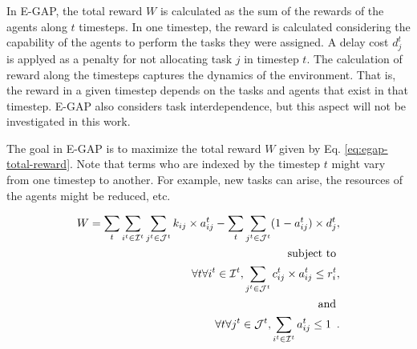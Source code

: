 \documentclass[a4paper]{sbgames}
\begin{document}
% 
In E-GAP, the total reward $W$ is calculated as the sum of the rewards of the agents along $t$ timesteps. In one timestep, the reward is calculated considering the capability of the agents to perform the tasks they were assigned. A delay cost $d_j^t$ is applyed as a penalty for not allocating task $j$ in timestep $t$. The calculation of reward along the timesteps captures the dynamics of the environment. That is, the reward in a given timestep depends on the tasks and agents that exist in that timestep. E-GAP also considers task interdependence, but this aspect will not be investigated in this work. 

The goal in E-GAP is to maximize the total reward $W$ given by Eq. \ref{eq:egap-total-reward}. Note that terms who are indexed by the timestep $t$ might vary from one timestep to another. For example, new tasks can arise, the resources of the agents might be reduced, etc.

\begin{equation}
\label{eq:egap-total-reward}
\begin{split}
W = \sum_t \sum_{i^t \in \mathcal{I}^t} \sum_{j^t \in \mathcal{J}^t} k_{ij} \times a_{ij}^t - 
\sum_t \sum_{j^t \in \mathcal{J}^t}(1 - a_{ij}^t) \times d_j^t ,\\
\text{ subject to }\\
\forall t \forall i^t \in \mathcal{I}^t, \sum_{j^t \in \mathcal{J}^t} c_{ij}^t \times a_{ij}^t \leq r_{i}^t ,\\
\text{ and }\\
\forall t \forall j^t \in \mathcal{J}^t, \sum_{i^t \in \mathcal{I}^t} a_{ij}^t \leq 1 \enspace .
\end{split}
\end{equation}
\end{document}
